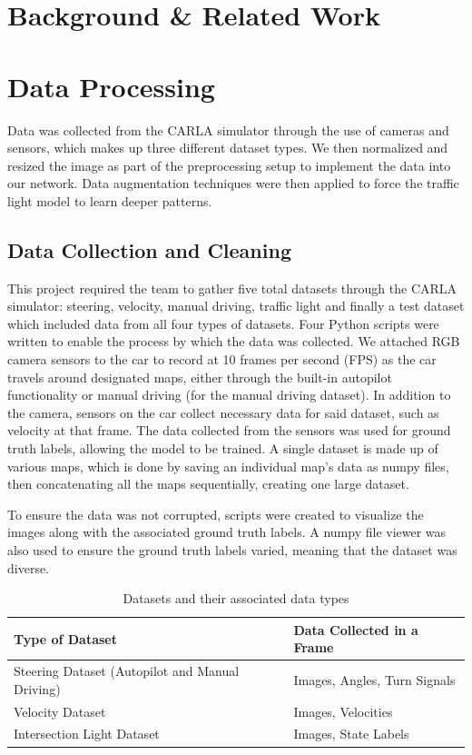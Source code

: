 \documentclass{article} %
\begin{document}
\section{Background \& Related Work}

\section{Data Processing}

Data was collected from the CARLA simulator through the use of cameras and sensors, which makes up three different dataset types. We then normalized and resized the image as part of the preprocessing setup to implement the data into our network. Data augmentation techniques were then applied to force the traffic light model to learn deeper patterns. 

\subsection{Data Collection and Cleaning}
This project required the team to gather five total datasets through the CARLA simulator: steering, velocity, manual driving, traffic light and finally a test dataset which included data from all four types of datasets. Four Python scripts were written to enable the process by which the data was collected. We attached RGB camera sensors to the car to record at 10 frames per second (FPS) as the car travels around designated maps, either through the built-in autopilot functionality or manual driving (for the manual driving dataset). In addition to the camera, sensors on the car collect necessary data for said dataset, such as velocity at that frame. The data collected from the sensors was used for ground truth labels, allowing the model to be trained. A single dataset is made up of various maps, which is done by saving an individual map’s data as numpy files, then concatenating all the maps sequentially, creating one large dataset. 

To ensure the data was not corrupted, scripts were created to visualize the images along with the associated ground truth labels. A numpy file viewer was also used to ensure the ground truth labels varied, meaning that the dataset was diverse.

\begin{table}[h]
\centering
\caption{Datasets and their associated data types}
\vspace{0.5em}
\begin{tabular}{|p{5cm}|p{7cm}|}
\hline
\textbf{Type of Dataset} & \textbf{Data Collected in a Frame} \\ \hline
Steering Dataset (Autopilot and Manual Driving) & Images, Angles, Turn Signals \\ \hline
Velocity Dataset & Images, Velocities \\ \hline
Intersection Light Dataset & Images, State Labels \\ \hline
\end{tabular}
\end{table}
\end{document}
